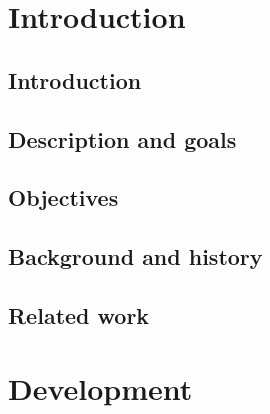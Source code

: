 \documentclass[BSP,english,oneside]{classes/gucthesis}
\begin{document}


\makefrontpages



\clearpage
\setcounter{page}{1}





\tableofcontents
\listoffigures
\listoftables



\newpage
\setcounter{page}{1}
\part{Introduction}
	
	\chapter{Introduction}
		\setcounter{page}{2}	%
		\label{chap:introduction}
		

	\chapter{Description and goals}
		\label{chap:description_goals}
		

	\chapter{Objectives}
		\label{chap:objectives}
		

	\chapter{Background and history}
		\label{chap:background}
		

	\chapter{Related work}
		\label{chap:related_work}
		


\part{Development}
\end{document}
